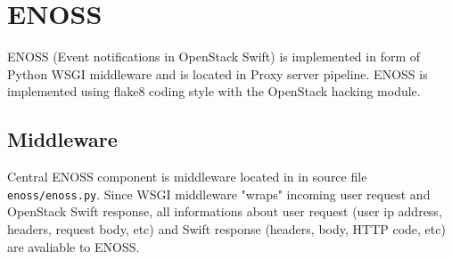 \section{ENOSS}
    ENOSS (Event notifications in OpenStack Swift) is implemented in form of Python WSGI middleware and is located in Proxy server pipeline. ENOSS is implemented using flake8 coding style with the OpenStack hacking module.

    \subsection{Middleware}
    Central ENOSS component is middleware located in in source file \texttt{enoss/enoss.py}. Since WSGI middleware "wraps" incoming user request and OpenStack Swift response, all informations about user request (user ip address, headers, request body, etc) and Swift response (headers, body, HTTP code, etc) are avaliable to ENOSS.

